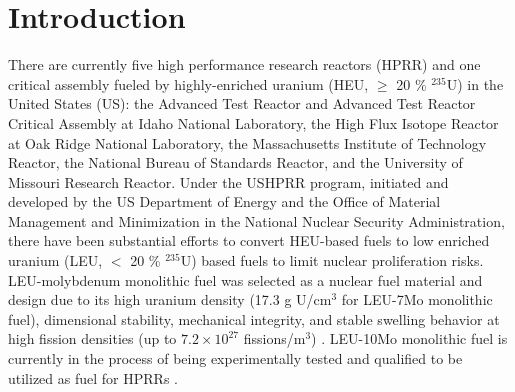 \documentclass[preprint,12pt]{elsarticle}
\begin{document}
\section{Introduction}
There are currently five high performance research reactors (HPRR) and one critical assembly fueled by highly-enriched uranium (HEU, $\geq$ 20 $\%$ $^{235}$U) in the United States (US): the Advanced Test Reactor and Advanced Test Reactor Critical Assembly at Idaho National Laboratory, the High Flux Isotope Reactor at Oak Ridge National Laboratory, the Massachusetts Institute of Technology Reactor, the National Bureau of Standards Reactor, and the University of Missouri Research Reactor. Under the USHPRR program, initiated and developed by the US Department of Energy and the Office of Material Management and Minimization in the National Nuclear Security Administration, there have been substantial efforts to convert HEU-based fuels to low enriched uranium (LEU, $<$ 20 $\%$ $^{235}$U) based fuels to limit nuclear proliferation risks. LEU-molybdenum monolithic fuel was selected as a nuclear fuel material and design due to its high uranium density (17.3 g U/cm$^{3}$ for LEU-7Mo monolithic fuel), dimensional stability, mechanical integrity, and stable swelling behavior at high fission densities (up to $7.2\times10^{27}$ fissions/m$^{3}$) \cite{kim2011fission, robinson2013irradiation, meyer2014irradiation, keiser2017observed, prabhakaran2017u, jue2018effects}. 
LEU-10Mo monolithic fuel is currently in the process of being experimentally tested and qualified to be utilized as fuel for HPRRs \cite{miller2021u, gan2017irradiated, giglio2021ushprr}.\\
\end{document}
